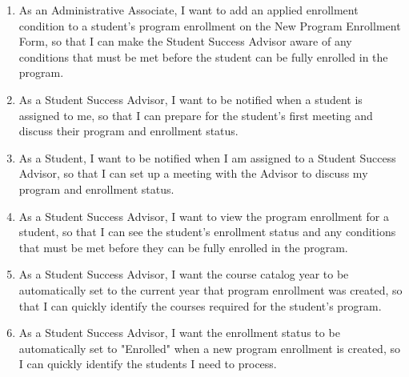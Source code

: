 \documentclass[12pt]{article}
\begin{document}
\begin{appendices}
\begin{enumerate}[label=(\roman*)]
\begin{enumerate}
            \item As an Administrative Associate, I want to add an applied enrollment condition to a student's program enrollment on the New Program Enrollment Form, so that I can make the Student Success Advisor aware of any conditions that must be met before the student can be fully enrolled in the program.
            \item As a Student Success Advisor, I want to be notified when a student is assigned to me, so that I can prepare for the student's first meeting and discuss their program and enrollment status.
            \item As a Student, I want to be notified when I am assigned to a Student Success Advisor, so that I can set up a meeting with the Advisor to discuss my program and enrollment status.
            \item As a Student Success Advisor, I want to view the program enrollment for a student, so that I can see the student's enrollment status and any conditions that must be met before they can be fully enrolled in the program.
            \item As a Student Success Advisor, I want the course catalog year to be automatically set to the current year that program enrollment was created, so that I can quickly identify the courses required for the student's program.
            \item As a Student Success Advisor, I want the enrollment status to be automatically set to "Enrolled" when a new program enrollment is created, so I can quickly identify the students I need to process.            
        \end{enumerate}



\end{enumerate}
\end{appendices}
\end{document}
